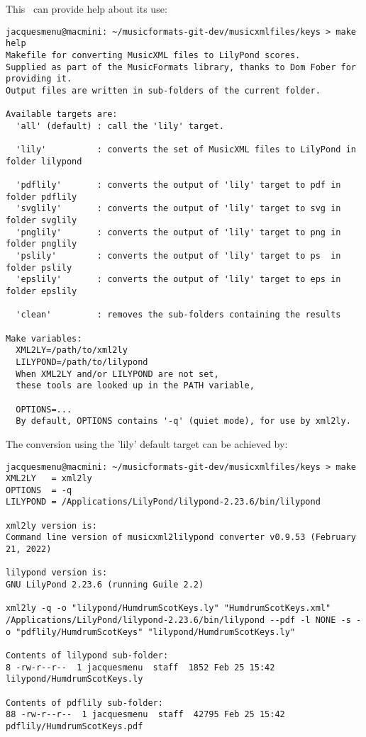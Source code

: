 This \Makefile\ can provide help about its use:
\begin{lstlisting}[language=Terminal]
jacquesmenu@macmini: ~/musicformats-git-dev/musicxmlfiles/keys > make help
Makefile for converting MusicXML files to LilyPond scores.
Supplied as part of the MusicFormats library, thanks to Dom Fober for providing it.
Output files are written in sub-folders of the current folder.

Available targets are:
  'all' (default) : call the 'lily' target.

  'lily'          : converts the set of MusicXML files to LilyPond in folder lilypond

  'pdflily'       : converts the output of 'lily' target to pdf in folder pdflily
  'svglily'       : converts the output of 'lily' target to svg in folder svglily
  'pnglily'       : converts the output of 'lily' target to png in folder pnglily
  'pslily'        : converts the output of 'lily' target to ps  in folder pslily
  'epslily'       : converts the output of 'lily' target to eps in folder epslily

  'clean'         : removes the sub-folders containing the results

Make variables:
  XML2LY=/path/to/xml2ly
  LILYPOND=/path/to/lilypond
  When XML2LY and/or LILYPOND are not set, 
  these tools are looked up in the PATH variable,

  OPTIONS=...
  By default, OPTIONS contains '-q' (quiet mode), for use by xml2ly.
\end{lstlisting}

The conversion using the 'lily' default target can be achieved by:
\begin{lstlisting}[language=Terminal]
jacquesmenu@macmini: ~/musicformats-git-dev/musicxmlfiles/keys > make
XML2LY   = xml2ly
OPTIONS  = -q
LILYPOND = /Applications/LilyPond/lilypond-2.23.6/bin/lilypond

xml2ly version is: 
Command line version of musicxml2lilypond converter v0.9.53 (February 21, 2022)

lilypond version is: 
GNU LilyPond 2.23.6 (running Guile 2.2)

xml2ly -q -o "lilypond/HumdrumScotKeys.ly" "HumdrumScotKeys.xml"
/Applications/LilyPond/lilypond-2.23.6/bin/lilypond --pdf -l NONE -s -o "pdflily/HumdrumScotKeys" "lilypond/HumdrumScotKeys.ly"

Contents of lilypond sub-folder:
8 -rw-r--r--  1 jacquesmenu  staff  1852 Feb 25 15:42 lilypond/HumdrumScotKeys.ly

Contents of pdflily sub-folder:
88 -rw-r--r--  1 jacquesmenu  staff  42795 Feb 25 15:42 pdflily/HumdrumScotKeys.pdf
\end{lstlisting}

